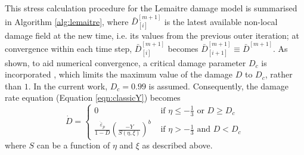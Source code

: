 \documentclass[sn-mathphys,Numbered,draft]{sn-jnl}%
\begin{document}




This stress calculation procedure for the Lemaitre damage model is summarised in Algorithm \ref{alg:lemaitre}, where $\bar{D}^{[m+1]}_{[i]}$ is the latest available non-local damage field at the new time, i.e. its values from the previous outer iteration; at convergence within each time step, $\bar{D}^{[m+1]}_{[i]}$ becomes $\bar{D}^{[m+1]}_{[i+1]} \equiv \bar{D}^{[m+1]}$.
As shown, to aid numerical convergence, a critical damage parameter $D_c$ is incorporated \cite{lemaitre_continuous_1985}, which limits the maximum value of the damage $D$ to $D_c$, rather than $1$.
In the current work, $D_c = 0.99$ is assumed.
Consequently, the damage rate equation (Equation \ref{eqn:classicY}) becomes
\begin{equation} \label{eq:damageLimit} %
	\dot{D} =
	\begin{cases}
		0 & \text { if } \eta \leq -\frac{1}{3} \text{ or } D \geq D_c \\
		\frac{\dot{\bar{\varepsilon}}_p}{1 - D}\left(\frac{-Y}{S(\eta,\xi)}\right)^b 
		& \text { if } \eta>-\frac{1}{3} \text{ and }  D < D_c
	\end{cases}
\end{equation}
where $S$ can be a function of $\eta$ and $\xi$ as described above.
\end{document}
